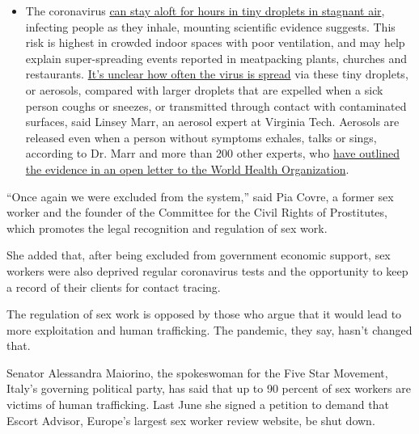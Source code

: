 \begin{itemize}
  \begin{itemize}
  \tightlist
  \item
    The coronavirus
    \href{https://www.nytimes.com/2020/07/04/health/239-experts-with-one-big-claim-the-coronavirus-is-airborne.html?action=click\&pgtype=Article\&state=default\&region=MAIN_CONTENT_3\&context=storylines_faq}{can
    stay aloft for hours in tiny droplets in stagnant air}, infecting
    people as they inhale, mounting scientific evidence suggests. This
    risk is highest in crowded indoor spaces with poor ventilation, and
    may help explain super-spreading events reported in meatpacking
    plants, churches and restaurants.
    \href{https://www.nytimes.com/2020/07/06/health/coronavirus-airborne-aerosols.html?action=click\&pgtype=Article\&state=default\&region=MAIN_CONTENT_3\&context=storylines_faq}{It's
    unclear how often the virus is spread} via these tiny droplets, or
    aerosols, compared with larger droplets that are expelled when a
    sick person coughs or sneezes, or transmitted through contact with
    contaminated surfaces, said Linsey Marr, an aerosol expert at
    Virginia Tech. Aerosols are released even when a person without
    symptoms exhales, talks or sings, according to Dr. Marr and more
    than 200 other experts, who
    \href{https://academic.oup.com/cid/article/doi/10.1093/cid/ciaa939/5867798}{have
    outlined the evidence in an open letter to the World Health
    Organization}.
  \end{itemize}
\end{itemize}

``Once again we were excluded from the system,'' said Pia Covre, a
former sex worker and the founder of the Committee for the Civil Rights
of Prostitutes, which promotes the legal recognition and regulation of
sex work.

She added that, after being excluded from government economic support,
sex workers were also deprived regular coronavirus tests and the
opportunity to keep a record of their clients for contact tracing.

The regulation of sex work is opposed by those who argue that it would
lead to more exploitation and human trafficking. The pandemic, they say,
hasn't changed that.

Senator Alessandra Maiorino, the spokeswoman for the Five Star Movement,
Italy's governing political party, has said that up to 90 percent of sex
workers are victims of human trafficking. Last June she signed a
petition to demand that Escort Advisor, Europe's largest sex worker
review website, be shut down.

